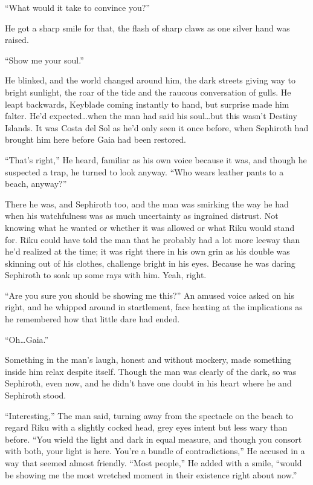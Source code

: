 ``What would it take to convince you?''

He got a sharp smile for that, the flash of sharp claws as one silver hand was raised.

``Show me your soul.''

He blinked, and the world changed around him, the dark streets giving way to bright sunlight, the roar of the tide and the raucous conversation of gulls. He leapt backwards, Keyblade coming instantly to hand, but surprise made him falter. He'd expected\ldots when the man had said his soul\ldots but this wasn't Destiny Islands. It was Costa del Sol as he'd only seen it once before, when Sephiroth had brought him here before Gaia had been restored.

``That's right,'' He heard, familiar as his own voice because it was, and though he suspected a trap, he turned to look anyway. ``Who wears leather pants to a beach, anyway?''

There he was, and Sephiroth too, and the man was smirking the way he had when his watchfulness was as much uncertainty as ingrained distrust. Not knowing what he wanted or whether it was allowed or what Riku would stand for. Riku could have told the man that he probably had a lot more leeway than he'd realized at the time; it was right there in his own grin as his double was skinning out of his clothes, challenge bright in his eyes. Because he was daring Sephiroth to soak up some rays with him. Yeah, right.

``Are you sure you should be showing me this?'' An amused voice asked on his right, and he whipped around in startlement, face heating at the implications as he remembered how that little dare had ended.

``Oh\ldots Gaia.''

Something in the man's laugh, honest and without mockery, made something inside him relax despite itself. Though the man was clearly of the dark, so was Sephiroth, even now, and he didn't have one doubt in his heart where he and Sephiroth stood.

``Interesting,'' The man said, turning away from the spectacle on the beach to regard Riku with a slightly cocked head, grey eyes intent but less wary than before. ``You wield the light and dark in equal measure, and though you consort with both, your light is here. You're a bundle of contradictions,'' He accused in a way that seemed almost friendly. ``Most people,'' He added with a smile, ``would be showing me the most wretched moment in their existence right about now.''

